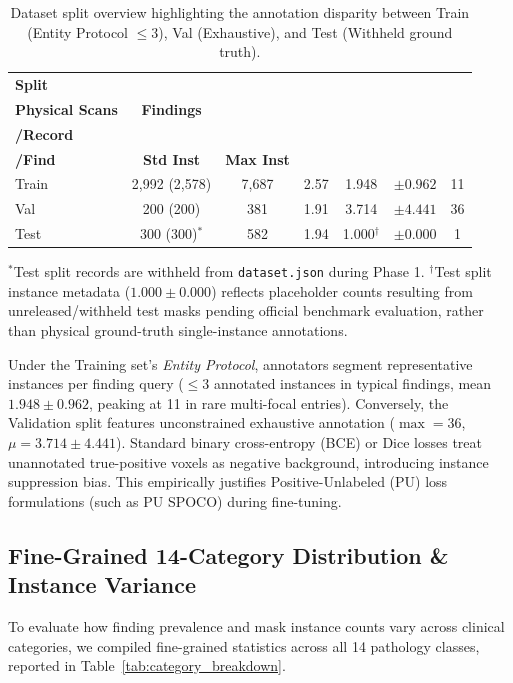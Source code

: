 \documentclass[11pt,a4paper]{article}
\begin{document}
\begin{table}[htbp]
\centering
\caption{Dataset split overview highlighting the annotation disparity between Train (Entity Protocol $\le 3$), Val (Exhaustive), and Test (Withheld ground truth).}
\label{tab:split_summary}
\footnotesize
\setlength{\tabcolsep}{6pt}
\begin{tabular}{lcccccc}
\toprule
\textbf{Split} & \makecell{\textbf{Records /}\\\textbf{Physical Scans}} & \textbf{Findings} & \makecell{\textbf{Findings}\\\textbf{/Record}} & \makecell{\textbf{Mean Inst}\\\textbf{/Find}} & \textbf{Std Inst} & \textbf{Max Inst} \\
\midrule
Train & 2,992 (2,578) & 7,687 & 2.57 & 1.948 & $\pm 0.962$ & 11 \\
Val   & 200 (200)     & 381   & 1.91 & 3.714 & $\pm 4.441$ & 36 \\
Test  & 300 (300)$^*$ & 582   & 1.94 & 1.000$^\dagger$ & $\pm 0.000$ & 1 \\
\bottomrule
\end{tabular}

\vspace{2mm}
\raggedright \footnotesize $^*$Test split records are withheld from \texttt{dataset.json} during Phase 1. $^\dagger$Test split instance metadata ($1.000 \pm 0.000$) reflects placeholder counts resulting from unreleased/withheld test masks pending official benchmark evaluation, rather than physical ground-truth single-instance annotations.
\end{table}

Under the Training set's \textit{Entity Protocol}, annotators segment representative instances per finding query ($\le 3$ annotated instances in typical findings, mean $1.948 \pm 0.962$, peaking at 11 in rare multi-focal entries). Conversely, the Validation split features unconstrained exhaustive annotation ($\max=36$, $\mu=3.714 \pm 4.441$). Standard binary cross-entropy (BCE) or Dice losses treat unannotated true-positive voxels as negative background, introducing instance suppression bias. This empirically justifies Positive-Unlabeled (PU) loss formulations (such as PU SPOCO) during fine-tuning.

\subsection{Fine-Grained 14-Category Distribution \& Instance Variance}
To evaluate how finding prevalence and mask instance counts vary across clinical categories, we compiled fine-grained statistics across all 14 pathology classes, reported in Table~\ref{tab:category_breakdown}.
\end{document}
